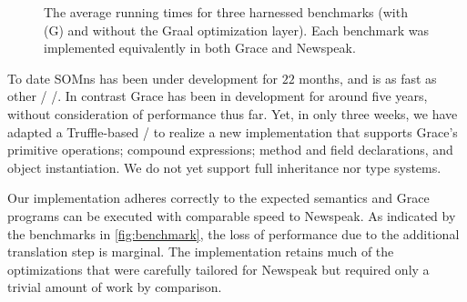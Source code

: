 \begin{figure}
    \centering
    \makebox[\columnwidth][c]{
        \resizebox{\columnwidth}{!}{
            
        }
    }
    \caption{The average running times for three harnessed benchmarks (with (G) and without the Graal optimization layer). Each benchmark was implemented equivalently in both Grace and Newspeak.}
    \label{fig:benchmark}
\end{figure}





To date SOMns has been under development for $22$ months, and is as fast as other \JITing/ \vms/. In contrast Grace has been in development for around five years, without consideration of performance thus far. Yet, in only three weeks, we have adapted a Truffle-based \vm/ to realize a new implementation that supports Grace's primitive operations; compound expressions; method and field declarations, and object instantiation. We do not yet support full inheritance nor type systems.

Our implementation adheres correctly to the expected semantics and Grace programs can be executed with comparable speed to Newspeak. As indicated by the benchmarks in \autoref{fig:benchmark}, the loss of performance due to the additional translation step is marginal. The implementation retains much of the optimizations that were carefully tailored for Newspeak but required only a trivial amount of work by comparison.



